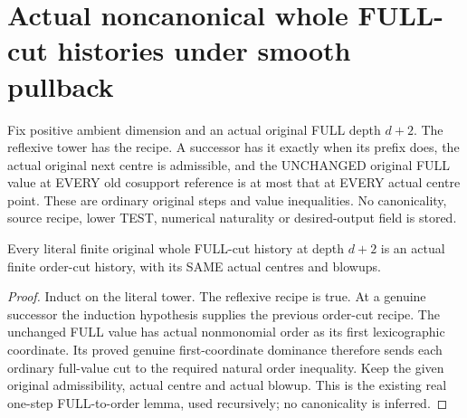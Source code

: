 \section{Actual noncanonical whole FULL-cut histories under smooth pullback}

\begin{definition}
\label{hir:original-finite-full-cut-history}
\leanok
Fix positive ambient dimension and an actual original FULL depth $d+2$.
The reflexive tower has the recipe. A successor has it exactly when its
prefix does, the actual original next centre is admissible, and the
UNCHANGED original FULL value at EVERY old cosupport reference is at most
that at EVERY actual centre point. These are ordinary original steps and
value inequalities. No canonicality, source recipe, lower TEST, numerical
naturality or desired-output field is stored.
\end{definition}

\begin{theorem}
\label{hir:original-finite-full-cut-order-history}
\leanok
Every literal finite original whole FULL-cut history at depth $d+2$ is an
actual finite order-cut history, with its SAME actual centres and blowups.
\end{theorem}
\begin{proof}
Induct on the literal tower. The reflexive recipe is true. At a genuine
successor the induction hypothesis supplies the previous order-cut recipe.
The unchanged FULL value has actual nonmonomial order as its first
lexicographic coordinate. Its proved genuine first-coordinate dominance
therefore sends each ordinary full-value cut to the required natural
order inequality. Keep the given original admissibility, actual centre
and actual blowup. This is the existing real one-step FULL-to-order lemma,
used recursively; no canonicality is inferred.
\end{proof}

